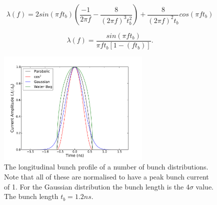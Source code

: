 \documentclass{cernrep}
\begin{document}
\begin{equation}
 \lambda \left( f \right) = 2 sin \left( \pi f t_{b} \right) \left( \frac{-1}{2 \pi f} - \frac{8}{\left( 2 \pi f \right)^{3}t_{b}^{2} }  \right) + \frac{8}{\left( 2 \pi f \right)^{2} t_{b}} cos \left( \pi f t_{b} \right)
\label{eqn:para_profile_freq}
\end{equation}

\begin{equation}
\lambda \left( f \right)  = \frac{sin \left( \pi f t_{b} \right)}{\pi f t_{b} \left[ 1 - \left( f t_{b} \right) \right]}.
\label{eqn:cos_profile_freq}
\end{equation}

\begin{figure}
\begin{center}
\includegraphics[width=0.65\textwidth]{figures/bunch_profile_12ns.pdf}
\end{center}
\caption{The longitudinal bunch profile of a number of bunch distributions. Note that all of these are normalised to have a peak bunch current of 1. For the Gaussian distribution the bunch length is the 4$\sigma$ value. The bunch length $t_{b} = 1.2ns$.}
\label{fig:time_bunch_profiles}
\end{figure}
\end{document}

